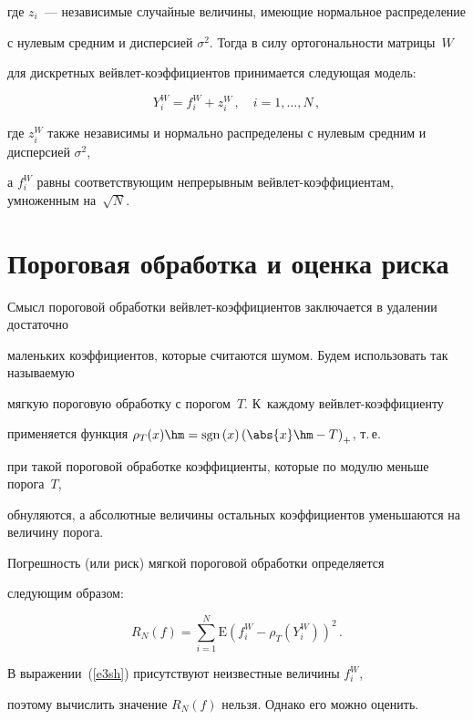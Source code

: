 где $z_i$~--- независимые случайные величины, имеющие нормальное распределение 

с нулевым средним и дисперсией $\sigma^2$. Тогда в силу ортогональности матрицы~$W$ 

для дискретных вейвлет-коэффициентов принимается следующая модель:

$$

Y^W_i=f^{W}_{i}+z^W_i\,,\quad i=1,\ldots,N\,,

$$

где $z^W_i$ также независимы и нормально распределены с нулевым средним и дисперсией $\sigma^2$, 

а $f^{W}_{i}$ равны соответствующим непрерывным вейвлет-коэффициентам, умноженным на~$\sqrt{N}$.



\section{Пороговая обработка и оценка риска}



Смысл пороговой обработки вейвлет-коэффициентов заключается в удалении достаточно 

маленьких коэффициентов, которые считаются шумом. Будем использовать так называемую 

мягкую пороговую обработку с порогом~$T$. К~каж\-до\-му вейв\-лет-ко\-эф\-фи\-ци\-ен\-ту 

применяется функция $\rho_T(x)\hm=\mathrm{sgn}\left(x\right)\left(\abs{x}\hm-T\right)_{+}$, т.\,е.\

при такой пороговой обработке коэффициенты, которые по модулю меньше порога~$T$, 

обнуляются, а абсолютные величины остальных коэффициентов уменьшаются на величину порога.

Погрешность (или риск) мягкой пороговой обработки определяется

следующим образом:

\begin{equation}

R_N(f)=\sum_{i=1}^{N}\mathrm{E}\left(f^{W}_{i}-\rho_T(Y^W_i)\right)^2\,.\label{e3sh}

\end{equation}

В выражении~(\ref{e3sh}) присутствуют неизвестные величины $f^{W}_{i}$, 

поэтому вычислить значение $R_N(f)$ нельзя. Однако его можно оценить. 

